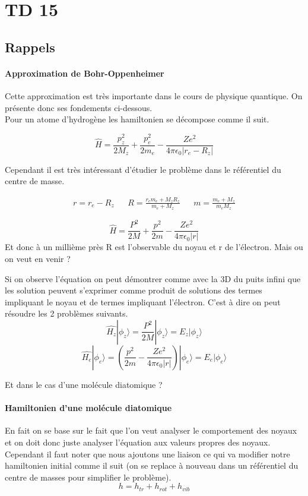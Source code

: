 \section{TD 15}



\subsection{Rappels}


\paragraph{Approximation de Bohr-Oppenheimer}

Cette approximation est très importante dans le cours de physique quantique. On présente donc ses fondements ci-dessous.\\
Pour un atome d'hydrogène les hamiltonien se décompose comme il suit.

\[
	\hat{H}=\frac{p_z^2}{2M_z}+\frac{p_e^2}{2m_e}-\frac{Ze^2}{4\pi \epsilon_0 |r_e-R_z|}
\]

Cependant il est très intéressant d'étudier le problème dans le référentiel du centre de masse.

\begin{align*}
	r=r_e-R_z && R=\frac{r_em_e+M_zR_z}{m_e+M_z} && m= \frac{m_e+M_z}{m_eM_z}
\end{align*}

\[
	\hat{H}=\frac{P^2}{2M}+\frac{p^2}{2m}-\frac{Ze^2}{4\pi \epsilon_0 |r|}
\]
Et donc à un millième près R est l'observable du noyau et r de l'électron. Mais ou on veut en venir ? 


Si on observe l'équation on peut démontrer comme avec la 3D du puits infini que les solution peuvent s'exprimer comme produit de solutions des termes impliquant le noyau et de termes impliquant l'électron. C'est à dire on peut résoudre les 2 problèmes suivants.
\[
	\hat{H_z}|\phi_z \rangle=\frac{P^2}{2M}|\phi_z \rangle=E_z|\phi_z \rangle
\]
\[
	\hat{H_e}|\phi_e \rangle=\left(\frac{p^2}{2m}-\frac{Ze^2}{4\pi \epsilon_0 |r|}\right)|\phi_e \rangle=E_e|\phi_e \rangle
\]

Et dans le cas d'une molécule diatomique ? 


\paragraph{Hamiltonien d'une molécule diatomique}

En fait on se base sur le fait que l'on veut analyser le comportement des noyaux et on doit donc juste analyser l'équation aux valeurs propres des noyaux. Cependant il faut noter que nous ajoutons une liaison ce qui va modifier notre hamiltonien initial comme il suit (on se replace à nouveau dans un référentiel du centre de masses pour simplifier le problème).
\[
	h=h_{tr}+h_{rot}+h_{vib}
\]


